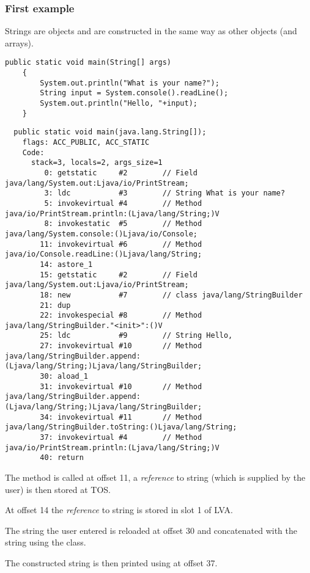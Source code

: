 \subsubsection{First example}

Strings are objects and are constructed in the same way as other objects (and arrays).


\begin{lstlisting}[style=customjava]
	public static void main(String[] args)
	{
		System.out.println("What is your name?");
		String input = System.console().readLine();
		System.out.println("Hello, "+input);
	}
\end{lstlisting}

\begin{lstlisting}
  public static void main(java.lang.String[]);
    flags: ACC_PUBLIC, ACC_STATIC
    Code:
      stack=3, locals=2, args_size=1
         0: getstatic     #2        // Field java/lang/System.out:Ljava/io/PrintStream;
         3: ldc           #3        // String What is your name?
         5: invokevirtual #4        // Method java/io/PrintStream.println:(Ljava/lang/String;)V
         8: invokestatic  #5        // Method java/lang/System.console:()Ljava/io/Console;
        11: invokevirtual #6        // Method java/io/Console.readLine:()Ljava/lang/String;
        14: astore_1      
        15: getstatic     #2        // Field java/lang/System.out:Ljava/io/PrintStream;
        18: new           #7        // class java/lang/StringBuilder
        21: dup           
        22: invokespecial #8        // Method java/lang/StringBuilder."<init>":()V
        25: ldc           #9        // String Hello, 
        27: invokevirtual #10       // Method java/lang/StringBuilder.append:(Ljava/lang/String;)Ljava/lang/StringBuilder;
        30: aload_1       
        31: invokevirtual #10       // Method java/lang/StringBuilder.append:(Ljava/lang/String;)Ljava/lang/StringBuilder;
        34: invokevirtual #11       // Method java/lang/StringBuilder.toString:()Ljava/lang/String;
        37: invokevirtual #4        // Method java/io/PrintStream.println:(Ljava/lang/String;)V
        40: return        
\end{lstlisting}

The  method is called at offset 11, a \emph{reference} to string (which is supplied by the user) 
is then stored at \ac{TOS}.

At offset 14 the \emph{reference} to string is stored in slot 1 of \ac{LVA}.

The string the user entered is reloaded at offset 30 and concatenated with the  string
using the  class.

The constructed string is then printed using  at offset 37.

